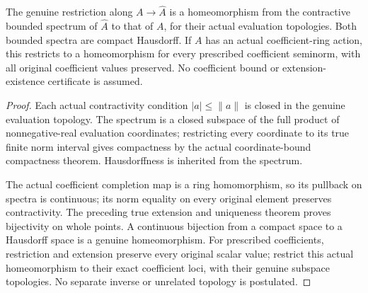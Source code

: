 \begin{theorem}
\label{spectrum:actual-bounded-completion-homeomorphism}
\leanok
{}
The genuine restriction along $A\to\widehat A$ is a homeomorphism
from the contractive bounded spectrum of $\widehat A$ to that of
$A$, for their actual evaluation topologies. Both bounded spectra
are compact Hausdorff. If $A$ has an actual coefficient-ring action,
this restricts to a homeomorphism for every prescribed coefficient
seminorm, with all original coefficient values preserved. No
coefficient bound or extension-existence certificate is assumed.
\end{theorem}
\begin{proof}
Each actual contractivity condition $|a|\leq\|a\|$ is closed in
the genuine evaluation topology. The spectrum is a closed subspace
of the full product of nonnegative-real evaluation coordinates;
restricting every coordinate to its true finite norm interval
gives compactness by the actual coordinate-bound compactness
theorem. Hausdorffness is inherited from the spectrum.

The actual coefficient completion map is a ring homomorphism, so
its pullback on spectra is continuous; its norm equality on every
original element preserves contractivity. The preceding true
extension and uniqueness theorem proves bijectivity on whole
points. A continuous bijection from a compact space to a Hausdorff
space is a genuine homeomorphism. For prescribed coefficients,
restriction and extension preserve every original scalar value;
restrict this actual homeomorphism to their exact coefficient
loci, with their genuine subspace topologies. No separate inverse
or unrelated topology is postulated.
\end{proof}

